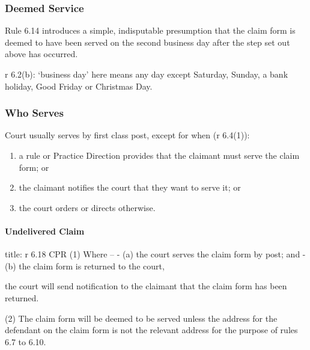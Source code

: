\documentclass[
]{article}
\newenvironment{Shaded}{}{}
\newcommand{\NormalTok}[1]{#1}
\providecommand{\tightlist}{%
  \setlength{\itemsep}{0pt}\setlength{\parskip}{0pt}}
\begin{document}
\hypertarget{deemed-service}{%
\subsubsection{Deemed Service}\label{deemed-service}}

\begin{Shaded}
\begin{Highlighting}[]
\NormalTok{Rule 6.14 introduces a simple, indisputable presumption that the claim form is deemed to have been served on the second business day after the step set out above has occurred.}
\end{Highlighting}
\end{Shaded}

r 6.2(b): `business day' here means any day except Saturday, Sunday, a
bank holiday, Good Friday or Christmas Day.

\hypertarget{who-serves}{%
\subsubsection{Who Serves}\label{who-serves}}

Court usually serves by first class post, except for when (r 6.4(1)):

\begin{enumerate}
\def\labelenumi{\arabic{enumi}.}
\tightlist
\item
  a rule or Practice Direction provides that the claimant must serve the
  claim form; or
\item
  the claimant notifies the court that they want to serve it; or
\item
  the court orders or directs otherwise.
\end{enumerate}

\hypertarget{undelivered-claim}{%
\paragraph{Undelivered Claim}\label{undelivered-claim}}

\begin{Shaded}
\begin{Highlighting}[]
\NormalTok{title: r 6.18 CPR}
\NormalTok{(1) Where –}
\NormalTok{{-} (a) the court serves the claim form by post; and}
\NormalTok{{-} (b) the claim form is returned to the court,}

\NormalTok{the court will send notification to the claimant that the claim form has been returned.}

\NormalTok{(2) The claim form will be deemed to be served unless the address for the defendant on the claim form is not the relevant address for the purpose of rules 6.7 to 6.10.}
\end{Highlighting}
\end{Shaded}
\end{document}
